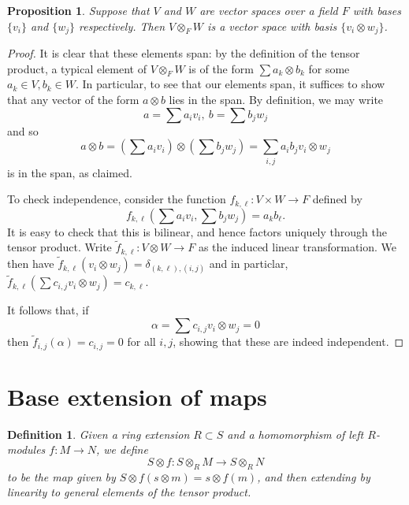 \documentclass[12pt]{report}
\theoremstyle{plain}
\newtheorem{defn}[thm]{Definition}
\newtheorem{prop}[thm]{Proposition}
\newcommand{\til}{\widetilde}
\begin{document}
\begin{prop}
Suppose that $V$ and $W$ are vector spaces over a field $F$ with bases
$\{v_i\}$ and $\{w_j\}$ respectively. Then $V \otimes_F W$ is a vector
space with basis $\{v_i \otimes w_j\}$.
\end{prop}
\begin{proof}
It is clear that these elements span: by the definition of the tensor
product, a typical element of $V \otimes_F W$ is of the form $\sum a_k
\otimes b_k$ for some $a_k \in V, b_k \in W$. In particular, to see that
our elements span, it suffices to show that any vector of the form $a
\otimes b$ lies in the span. By definition, we may write
\[ a = \sum a_i v_i, \ b = \sum b_j w_j \]
and so
\[ a \otimes b = (\sum a_i v_i) \otimes (\sum b_j w_j) = \sum_{i,j} a_i b_j
v_i \otimes w_j \]
is in the span, as claimed.

To check independence, consider the function $f_{k,\ell} : V \times W \to F$
defined by
\[ f_{k, \ell} (\sum a_i v_i, \sum b_j w_j) = a_k b_\ell.\]
It is easy to check that this is bilinear, and hence factors uniquely
through the tensor product. Write $\til f_{k, \ell} : V \otimes W \to F$ as
the induced linear transformation. We then have 
$\til f_{k, \ell} (v_i \otimes w_j) = \delta_{(k, \ell), (i, j)}$ 
and in particlar, 
$\til f_{k, \ell}(\sum c_{i,j} v_i \otimes w_j) = c_{k, \ell}$.

It follows that, if 
\[\alpha = \sum c_{i, j} v_i \otimes w_j = 0\]
then $\til f_{i, j}(\alpha) = c_{i, j} = 0$ for all $i, j$, showing that
these are indeed independent.
\end{proof}

\section{Base extension of maps}

\begin{defn}
Given a ring extension $R \subset S$ and a homomorphism of left $R$-modules
$f : M \to N$, we define 
\[S \otimes f : S \otimes_R M \to S \otimes_R N\]
to be the map given by $S \otimes f (s \otimes m) = s \otimes f(m)$, and
then extending by linearity to general elements of the tensor product.
\end{defn}
\end{document}
